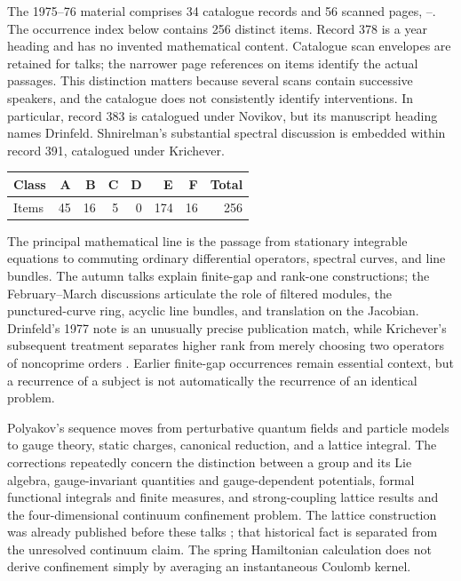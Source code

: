 The 1975--76 material comprises 34 catalogue records and 56 scanned pages,
--. The occurrence index below contains
256 distinct items. Record 378 is a year heading and has no invented
mathematical content. Catalogue scan envelopes are retained for talks;
the narrower page references on items identify the actual passages.
This distinction matters because several scans contain successive
speakers, and the catalogue does not consistently identify interventions.
In particular, record 383 is catalogued under Novikov, but its manuscript
heading names Drinfeld. Shnirelman's substantial spectral discussion is
embedded within record 391, catalogued under Krichever.

\begin{center}
\begin{tabular}{lrrrrrrr}
\toprule
Class&A&B&C&D&E&F&Total\\
\midrule
Items&45&16&5&0&174&16&256\\
\bottomrule
\end{tabular}
\end{center}

The principal mathematical line is the passage from stationary integrable
equations to commuting ordinary differential operators, spectral curves,
and line bundles. The autumn talks explain finite-gap and rank-one
constructions; the February--March discussions articulate the role of
filtered modules, the punctured-curve ring, acyclic line bundles, and
translation on the Jacobian. Drinfeld's 1977 note is an unusually precise
publication match, while Krichever's subsequent treatment separates
higher rank from merely choosing two operators of noncoprime orders
\citep{drinfeld1977commutative,krichever1978commutative}.
Earlier finite-gap occurrences remain essential context, but a recurrence
of a subject is not automatically the recurrence of an identical problem.

Polyakov's sequence moves from perturbative quantum fields and particle
models to gauge theory, static charges, canonical reduction, and a
lattice integral. The corrections repeatedly concern the distinction
between a group and its Lie algebra, gauge-invariant quantities and
gauge-dependent potentials, formal functional integrals and finite
measures, and strong-coupling lattice results and the four-dimensional
continuum confinement problem. The lattice construction was already
published before these talks \citep{wilson1974confinement}; that historical
fact is separated from the unresolved continuum claim. The spring
Hamiltonian calculation does not derive confinement simply by averaging
an instantaneous Coulomb kernel.

